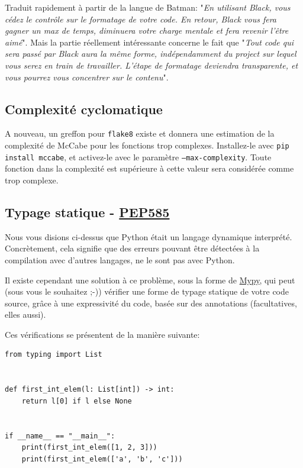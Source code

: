 \documentclass[11pt]{amsbook}
\begin{document}
Traduit rapidement à partir de la langue de Batman: "\emph{En utilisant Black, vous cédez le contrôle sur le formatage de votre code. En retour, Black vous fera gagner un max de temps, diminuera votre charge mentale et fera revenir l’être aimé}".
Mais la partie réellement intéressante concerne le fait que "\emph{Tout code qui sera passé par Black aura la même forme, indépendamment du project sur lequel vous serez en train de travailler. L’étape de formatage deviendra transparente, et vous pourrez vous concentrer sur le contenu}".


\hypertarget{x-complexité-cyclomatique}{\subsection{Complexité cyclomatique}}
A nouveau, un greffon pour \texttt{flake8} existe et donnera une estimation de la complexité de McCabe pour les fonctions trop complexes. Installez-le avec \texttt{pip install mccabe}, et activez-le avec le paramètre \texttt{--max-complexity}. Toute fonction dans la complexité est supérieure à cette valeur sera considérée comme trop complexe.


\hypertarget{x-typage-statique---\href{https://www.python.org/dev/peps/pep-0585/}{pep585}}{\subsection{Typage statique - \href{https://www.python.org/dev/peps/pep-0585/}{PEP585}}}
Nous vous disions ci-dessus que Python était un langage dynamique interprété.
Concrètement, cela signifie que des erreurs pouvant être détectées à la compilation avec d’autres langages, ne le sont pas avec Python.


Il existe cependant une solution à ce problème, sous la forme de \href{http://mypy-lang.org/}{Mypy}, qui peut (sous vous le souhaitez ;-)) vérifier une forme de typage statique de votre code source, grâce à une expressivité du code, basée sur des annotations (facultatives, elles aussi).


Ces vérifications se présentent de la manière suivante:


\begin{verbatim}
from typing import List


def first_int_elem(l: List[int]) -> int:
    return l[0] if l else None


if __name__ == "__main__":
    print(first_int_elem([1, 2, 3]))
    print(first_int_elem(['a', 'b', 'c']))
\end{verbatim}
\end{document}
